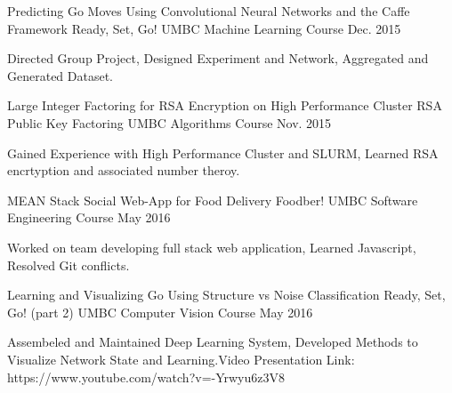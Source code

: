 

\begin{cventries}

  \cventry
    {Predicting Go Moves Using Convolutional Neural Networks and the Caffe Framework} %
    {Ready, Set, Go!} %
    {UMBC Machine Learning Course} %
    {Dec. 2015} %
    {
      \begin{cvitems} %
        \item {Directed Group Project, Designed Experiment and Network, Aggregated and Generated Dataset.}
      \end{cvitems}
    }

  \cventry
    {Large Integer Factoring for RSA Encryption on High Performance Cluster} %
    {RSA Public Key Factoring} %
    {UMBC Algorithms Course} %
    {Nov. 2015} %
    {
      \begin{cvitems} %
        \item {Gained Experience with High Performance Cluster and SLURM, Learned RSA encrtyption and associated number theroy.}
      \end{cvitems}
    }

  \cventry
    {MEAN Stack Social Web-App for Food Delivery} %
    {Foodber!} %
    {UMBC Software Engineering Course} %
    {May 2016} %
    {
      \begin{cvitems} %
        \item {Worked on team developing full stack web application, Learned Javascript, Resolved Git conflicts.}
      \end{cvitems}
    }

  \cventry
    {Learning and Visualizing Go Using Structure vs Noise Classification} %
    {Ready, Set, Go! (part 2)} %
    {UMBC Computer Vision Course} %
    {May 2016} %
    {
      \begin{cvitems} %
        \item {Assembeled and Maintained Deep Learning System, Developed Methods to Visualize Network State and Learning.\newline Video Presentation Link: https://www.youtube.com/watch?v=-Yrwyu6z3V8 }
      \end{cvitems}
    }


\end{cventries}
